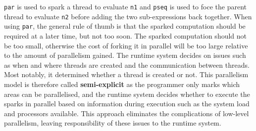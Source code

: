 \documentclass[CS4204-Notes.tex]{subfiles}
\begin{document}
\texttt{par} is used to spark a thread to evaluate \texttt{n1} and \texttt{pseq} is used to foce the parent thread to evaluate \texttt{n2} before adding the two sub-expressions back together. When using \texttt{par}, the general rule of thumb is that the sparked computation should be required at a later time, but not too soon. The sparked computation should not be too small, otherwise the cost of forking it in parallel will be too large relative to the amount of parallelism gained. The runtime system decides on issues such as when and where threads are created and the communication between threads. Most notably, it determined whether a thread is created or not. This parallelism model is therefore called \textbf{semi-explicit} as the programmer only marks which areas can be parallelised, and the runtime system decides whether to execute the sparks in parallel based on information during execution such as the system load and processors available. This approach eliminates the complications of low-level parallelism, leaving responsibility of these issues to the runtime system. 
\end{document}

